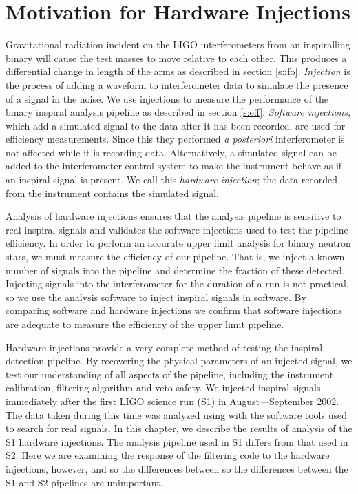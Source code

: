 
\section{Motivation for Hardware Injections}
\label{s:motivation}
Gravitational radiation incident on the LIGO interferometers from an
inspiralling binary will cause the test masses to move relative to each other.
This produces a differential change in length of the arms as described in
section \ref{s:ifo}.  \emph{Injection} is the process of adding a waveform to
interferometer data to simulate the presence of a signal in the noise. We use
injections to measure the performance of the binary inspiral analysis
pipeline as described in section \ref{s:eff}.  \emph{Software injections},
which add a simulated signal to the data after it has been recorded, are used
for efficiency measurements. Since this they performed \emph{a posteriori}
interferometer is not affected while it is recording data.  Alternatively, a
simulated signal can be added to the interferometer control system to make the
instrument behave as if an inspiral signal is present. We call this
\emph{hardware injection}; the data recorded from the instrument contains the
simulated signal.

Analysis of hardware injections ensures that the analysis pipeline is
sensitive to real inspiral signals and validates the software injections used
to test the pipeline efficiency.  In order to perform an accurate upper limit
analysis for binary neutron stars, we must measure the efficiency of our
pipeline. That is, we inject a known number of signals into the pipeline and
determine the fraction of these detected.  Injecting signals into the
interferometer for the duration of a run is not practical, so we use the
analysis software to inject inspiral signals in software.  By comparing
software and hardware injections we confirm that software injections are
adequate to measure the efficiency of the upper limit pipeline.

Hardware injections provide a very complete method of testing the inspiral
detection pipeline. By recovering the physical parameters of an injected
signal, we test our understanding of all aspects of the pipeline, including
the instrument calibration, filtering algorithm and veto safety. We injected
inspiral signals immediately after the first LIGO science run (S1) in
August---September 2002. The data taken during this time was analyzed using
with the software tools used to search for real signals.  In this chapter, we
describe the results of analysis of the S1 hardware injections. The analysis
pipeline used in S1 differs from that used in S2\cite{abbott2003b}. Here we
are examining the response of the filtering code to the hardware injections,
however, and so the differences between so the differences between the S1 and
S2 pipelines are unimportant.

